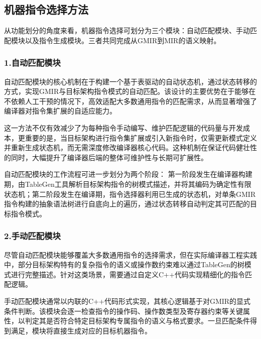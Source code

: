 \subsection{机器指令选择方法}
从功能划分的角度来看，机器指令选择可划分为三个模块：自动匹配模块、手动匹配模块以及指令生成模块。三者共同完成从GMIR到MIR的语义映射。


\subsubsection{1.自动匹配模块}
自动匹配模块的核心机制在于构建一个基于表驱动的自动状态机，通过状态转移的方式，实现GMIR与目标架构指令模式的自动匹配。该设计的主要优势在于能够在不依赖人工干预的情况下，高效适配大多数通用指令的匹配需求，从而显著增强了编译器对指令集扩展的自适应能力。

\par

这一方法不仅有效减少了为每种指令手动编写、维护匹配逻辑的代码量与开发成本，更重要的是，当目标架构进行指令集扩展或引入新指令时，仅需更新模式定义并重新生成状态机，而无需深度修改编译器核心代码。这种机制在保证代码健壮性的同时，大幅提升了编译器后端的整体可维护性与长期可扩展性。

\par

自动匹配模块的工作流程可进一步划分为两个阶段：
第一阶段发生在编译器构建期，由TableGen工具解析目标架构指令的树模式描述，并将其编码为确定性有限状态机；第二阶段发生在编译期，指令选择器利用已生成的状态机，对单条GMIR指令构建的抽象语法树进行自底向上的遍历，通过状态转移自动判定其可匹配的目标指令模式。


\subsubsection{2.手动匹配模块}
尽管自动匹配模块能够覆盖大多数通用指令的选择需求，但在实际编译器工程实践中，部分目标架构特有的复杂指令的语义或操作数约束难以通过TableGen的树模式进行完整描述。针对这类场景，需要通过自定义C++代码实现精细化的指令匹配逻辑。

\par

手动匹配模块通常以内联的C++代码形式实现，其核心逻辑基于对GMIR的显式条件判断。该模块会逐一检查指令的操作码、操作数类型及寄存器约束等关键属性，以判定其是否符合特定目标架构专属指令的语义与格式要求。一旦匹配条件得到满足，模块将直接生成对应的目标机器指令。

\par

